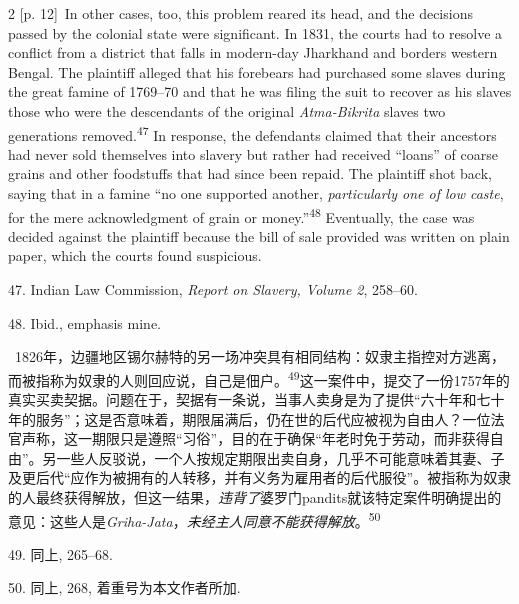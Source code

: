 \documentclass[10pt,a4paper]{article}
\begin{document}
\begin{paracol}{2}
{\scriptsize\color{gray} [p. 12]}\ In other cases, too, this problem reared its head, and the decisions passed by the colonial state were significant. In 1831, the courts had to resolve a conflict from a district that falls in modern-day Jharkhand and borders western Bengal. The plaintiff alleged that his forebears had purchased some slaves during the great famine of 1769–70 and that he was filing the suit to recover as his slaves those who were the descendants of the original \textit{Atma-Bikrita} slaves two generations removed.\nobreak\textsuperscript{47} In response, the defendants claimed that their ancestors had never sold themselves into slavery but rather had received “loans” of coarse grains and other foodstuffs that had since been repaid. The plaintiff shot back, saying that in a famine “no one supported another, \textit{particularly one of low caste}, for the mere acknowledgment of grain or money.”\nobreak\textsuperscript{48} Eventually, the case was decided against the plaintiff because the bill of sale provided was written on plain paper, which the courts found suspicious.\par{\small 47. Indian Law Commission, \textit{Report on Slavery, Volume 2}, 258–60.\par}{\small 48. Ibid., emphasis mine.\par}
\switchcolumn*
{\scriptsize\color{gray} [p. 12]}\ 1826年，边疆地区锡尔赫特的另一场冲突具有相同结构：奴隶主指控对方逃离，而被指称为奴隶的人则回应说，自己是佃\mbox{户。\textsuperscript{49}}这一案件中，提交了一份1757年的真实买卖契据。问题在于，契据有一条说，当事人卖身是为了提供“六十年和七十年的服务”；这是否意味着，期限届满后，仍在世的后代应被视为自由人？一位法官声称，这一期限只是遵照“习俗”，目的在于确保“年老时免于劳动，而非获得自由”。另一些人反驳说，一个人按规定期限出卖自身，几乎不可能意味着其妻、子及更后代“应作为被拥有的人转移，并有义务为雇用者的后代服役”。被指称为奴隶的人最终获得解放，但这一结果，\textit{违背了}婆罗门pandits就该特定案件明确提出的意见：这些人是\textit{Griha-Jata}，\textit{未经主人同意不能获得解放}。\nobreak\textsuperscript{50}\par{\small 49. 同上, 265–68.\par}{\small 50. 同上, 268, 着重号为本文作者所加.\par}
\switchcolumn

\end{paracol}
\end{document}
